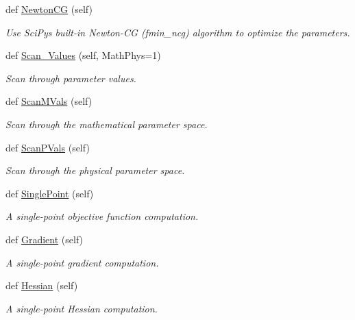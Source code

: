 \begin{DoxyCompactItemize}
def \hyperlink{classsrc_1_1optimizer_1_1Optimizer_aa1a6d36bfd020d4eb2d0fb238777d369}{Newton\+CG} (self)
\begin{DoxyCompactList}\small\item\em Use Sci\+Py\textquotesingle{}s built-\/in Newton-\/\+CG (fmin\+\_\+ncg) algorithm to optimize the parameters. \end{DoxyCompactList}\item 
def \hyperlink{classsrc_1_1optimizer_1_1Optimizer_a98e20ccc6c2d2cf5f6c611a0441e14bb}{Scan\+\_\+\+Values} (self, Math\+Phys=1)
\begin{DoxyCompactList}\small\item\em Scan through parameter values. \end{DoxyCompactList}\item 
def \hyperlink{classsrc_1_1optimizer_1_1Optimizer_a23cdd9fad58bbc9a6f5659ed3bbededc}{Scan\+M\+Vals} (self)
\begin{DoxyCompactList}\small\item\em Scan through the mathematical parameter space. \end{DoxyCompactList}\item 
def \hyperlink{classsrc_1_1optimizer_1_1Optimizer_ad139c2963ecdfbf3abbce6027dfb9ac9}{Scan\+P\+Vals} (self)
\begin{DoxyCompactList}\small\item\em Scan through the physical parameter space. \end{DoxyCompactList}\item 
def \hyperlink{classsrc_1_1optimizer_1_1Optimizer_afe5c560532731458954ae6e9093b8376}{Single\+Point} (self)
\begin{DoxyCompactList}\small\item\em A single-\/point objective function computation. \end{DoxyCompactList}\item 
def \hyperlink{classsrc_1_1optimizer_1_1Optimizer_af36709d05d137d77d4b8e0957b3c807e}{Gradient} (self)
\begin{DoxyCompactList}\small\item\em A single-\/point gradient computation. \end{DoxyCompactList}\item 
def \hyperlink{classsrc_1_1optimizer_1_1Optimizer_ac844fd676b7e9d08c0c9bca811838c3a}{Hessian} (self)
\begin{DoxyCompactList}\small\item\em A single-\/point Hessian computation. \end{DoxyCompactList}\item 

\end{DoxyCompactItemize}
